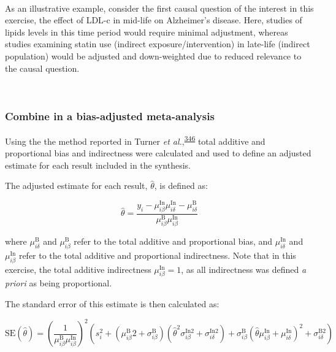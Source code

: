 \documentclass[a4paper, twoside]{templates/ociamthesis}
\begin{document}
~

As an illustrative example, consider the first causal question of the interest in this exercise, the effect of LDL-c in mid-life on Alzheimer's disease. Here, studies of lipids levels in this time period would require minimal adjustment, whereas studies examining statin use (indirect exposure/intervention) in late-life (indirect population) would be adjusted and down-weighted due to reduced relevance to the causal question.

~

\hypertarget{combine-in-a-bias-adjusted-meta-analysis}{%
\subsubsection{Combine in a bias-adjusted meta-analysis}\label{combine-in-a-bias-adjusted-meta-analysis}}

Using the the method reported in Turner \emph{et al.},\textsuperscript{\protect\hyperlink{ref-turner2009}{346}} total additive and proportional bias and indirectness were calculated and used to define an adjusted estimate for each result included in the synthesis.

The adjusted estimate for each result, \(\hat\theta\), is defined as:

\begin{equation}
  \hat{\theta} = \frac{y_i - \mu_{i\beta}^{\mathrm{In}}\mu_{i\delta}^{\mathrm{In}} - \mu_{i\delta}^{\mathrm{B}}}{\mu_{i\beta}^{\mathrm{B}}\mu_{i\beta}^{\mathrm{In}}}
  \label{eq:adjusted-mean}
\end{equation}

where \(\mu_{i\delta}^{\mathrm{B}}\) and \(\mu_{i\beta}^{\mathrm{B}}\) refer to the total additive and proportional bias, and \(\mu_{i\delta}^{\mathrm{In}}\) and \(\mu_{i\beta}^{\mathrm{In}}\) refer to the total additive and proportional indirectness. Note that in this exercise, the total additive indirectness \(\mu_{i\beta}^{\mathrm{In}} = 1\), as all indirectness was defined \emph{a priori} as being proportional.

The standard error of this estimate is then calculated as:

\begin{equation}
  \mathrm{SE}(\hat{\theta})=\left(\frac{1}{\mu_{i \beta}^{\mathrm{B}} \mu_{i \beta}^{\mathrm{In}}}\right)^{2}\left(s_{i}^{2}+\left(\mu_{i \beta}^{\mathrm{B}} 2+\sigma_{i \beta}^{\mathrm{B}}\right)\left(\hat{\theta}^{2} \sigma_{i \beta}^{\mathrm{In} 2}+\sigma_{i \delta}^{\mathrm{In} 2}\right)+\sigma_{i \beta}^{\mathrm{B}}\left(\hat{\theta} \mu_{i \beta}^{\mathrm{In}}+\mu_{i \delta}^{\mathrm{In}}\right)^{2}+\sigma_{i \delta}^{\mathrm{B} 2}\right)
  \label{eq:adjusted-se}
\end{equation}
\end{document}
